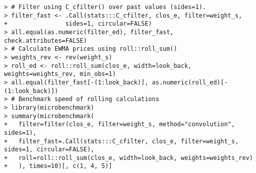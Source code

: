 \documentclass[10pt]{beamer}\usepackage[]{graphicx}\usepackage[]{color}
\makeatletter
\newenvironment{kframe}{%
 \def\at@end@of@kframe{}%
 \ifinner\ifhmode%
  \def\at@end@of@kframe{\end{minipage}}%
  \begin{minipage}{\columnwidth}%
 \fi\fi%
 \def\FrameCommand##1{\hskip\@totalleftmargin \hskip-\fboxsep
 \colorbox{shadecolor}{##1}\hskip-\fboxsep
     \hskip-\linewidth \hskip-\@totalleftmargin \hskip\columnwidth}%
 \MakeFramed {\advance\hsize-\width
   \@totalleftmargin\z@ \linewidth\hsize
   \@setminipage}}%
 {\par\unskip\endMakeFramed%
 \at@end@of@kframe}
\newenvironment{knitrout}{}{} %
\makeatother
\begin{document}
\begin{frame}[fragile,t]{\subsecname}
\begin{block}{}
\begin{columns}[T]
\begin{knitrout}
\begin{kframe}
\begin{verbatim}
> # Filter using C_cfilter() over past values (sides=1).
> filter_fast <- .Call(stats:::C_cfilter, clos_e, filter=weight_s,
+                sides=1, circular=FALSE)
> all.equal(as.numeric(filter_ed), filter_fast, check.attributes=FALSE)
> # Calculate EWMA prices using roll::roll_sum()
> weights_rev <- rev(weight_s)
> roll_ed <- roll::roll_sum(clos_e, width=look_back, weights=weights_rev, min_obs=1)
> all.equal(filter_fast[-(1:look_back)], as.numeric(roll_ed)[-(1:look_back)])
> # Benchmark speed of rolling calculations
> library(microbenchmark)
> summary(microbenchmark(
+   filter=filter(clos_e, filter=weight_s, method="convolution", sides=1),
+   filter_fast=.Call(stats:::C_cfilter, clos_e, filter=weight_s, sides=1, circular=FALSE),
+   roll=roll::roll_sum(clos_e, width=look_back, weights=weights_rev)
+   ), times=10)[, c(1, 4, 5)]
\end{verbatim}
\end{kframe}
\end{knitrout}
  \end{columns}
\end{block}

\end{frame}


\end{document}

